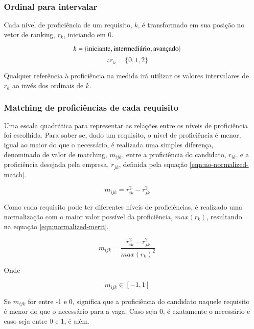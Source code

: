 \documentclass[preprint,12pt]{elsarticle}
\begin{document}
\subsubsection{Ordinal para intervalar}
\label{sssec:ordinal-interval}
Cada nível de proficiência de um requisito, $k$, é transformado em sua posição no vetor de ranking, $r_k$, iniciando em 0.
    
$$\\k = \{ \text{iniciante}, \text{intermediário}, \text{avançado} \}$$ 
$$ \therefore r_k = \{ 0, 1, 2 \} $$

Qualquer referência à proficiência na medida irá utilizar os valores intervalares de $r_k$ ao invés dos ordinais de $k$.

\subsubsection{Matching de proficiências de cada requisito}
\label{sssec:matching}
Uma escala quadrática para representar as relações entre os níveis de proficiência foi escolhida. Para saber se, dado um requisito, o nível de proficiência é menor, igual ao maior do que o necessário, é realizada uma simples diferença, denominado de valor de matching, $m_{ijk}$, entre a proficiência do candidato, $r_{ik}$, e a proficiência desejada pela empresa, $r_{jk}$, definida pela equação \ref{eqn:no-normalized-match}.
    
\begin{equation}
\label{eqn:no-normalized-match}
   m_{ijk} = r_{ik}^2 - r_{jk}^2
\end{equation}

Como cada requisito pode ter diferentes níveis de proficiências, é realizado uma normalização com o maior valor possível da proficiência, $max(r_k)$, resultando na equação \ref{eqn:normalized-merit}.
    
\begin{equation}
\label{eqn:normalized-merit}
m_{ijk} = \frac{r_{ik}^2 - r_{jk}^2}{max(r_k)^2}
\end{equation}

Onde

\begin{equation}
m_{ijk} \in [-1, 1]
\end{equation}

Se $m_{ijk}$ for entre -1 e 0, significa que a proficiência do candidato naquele requisito é menor do que o necessário para a vaga. Caso seja 0, é exatamente o necessário e caso seja entre 0 e 1, é além.
\end{document}
